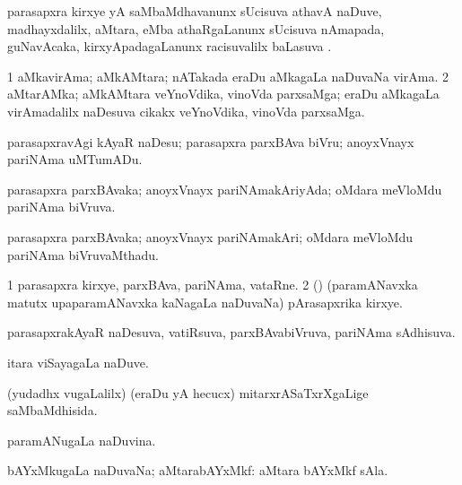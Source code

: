 \bentry
{}
\gl{\saMkiSx}
\bmng
{} 
\emng
\eentry

\bentry
{}
\gl{\sapUpa}
\bmng
parasapxra kirxye yA saMbaMdhavanunx sUcisuva athavA naDuve, madhayxdalilx, aMtara, eMba athaRgaLanunx sUcisuva nAmapada, guNavAcaka, kirxyApadagaLanunx racisuvalilx baLasuva \pUparx. 
\emng
\eentry

\bentry
{}
\gl{\nA}
\bmng
\bnum
\num{1} aMkavirAma; aMkAMtara; nATakada eraDu aMkagaLa naDuvaNa virAma. 
\num{2} aMtarAMka; aMkAMtara veYnoVdika, vinoVda parxsaMga; eraDu aMkagaLa virAmadalilx naDesuva cikakx veYnoVdika, vinoVda parxsaMga. 
\enum
\emng
\eentry

\bentry
{}
\gl{\akirx}
\bmng
parasapxravAgi kAyaR naDesu; parasapxra parxBAva biVru; anoyxVnayx pariNAma uMTumADu. 
\emng
\eentry

\bentry
{}
\gl{\gu}
\bmng
parasapxra parxBAvaka; anoyxVnayx pariNAmakAriyAda; oMdara meVloMdu pariNAma biVruva. 
\emng
\eentry

\bentry
{}
\gl{\nA}
\bmng
parasapxra parxBAvaka; anoyxVnayx pariNAmakAri; oMdara meVloMdu pariNAma biVruvaMthadu. 
\emng
\eentry

\bentry
{}
\gl{\nA}
\bmng
\bnum
\num{1} parasapxra kirxye, parxBAva, pariNAma, vataRne. 
\num{2} (\Bwvi) (paramANavxka matutx upaparamANavxka kaNagaLa naDuvaNa) pArasapxrika kirxye. 
\enum
\emng
\eentry

\bentry
{}
\gl{\gu}
\bmng
parasapxrakAyaR naDesuva, vatiRsuva, parxBAvabiVruva, pariNAma sAdhisuva. 
\emng
\eentry

\bentry
{}
\gl{\kirxvi}
\expl{\Latin }
\bmng
itara viSayagaLa naDuve. 
\emng
\eentry

\bentry
{}
\gl{\gu}
\bmng
(yudadhx \mo vugaLalilx) (eraDu yA hecucx) mitarxrASaTxrXgaLige saMbaMdhisida. 
\emng
\eentry

\bentry
{}
\gl{\gu}
\bmng
paramANugaLa naDuvina. 
\emng
\eentry

\bentry
{}
\gl{\gu}
\bmng
bAYxMkugaLa naDuvaNa; aMtarabAYxMkf:  aMtara bAYxMkf sAla. 
\emng
\eentry

